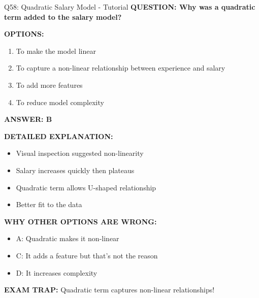\documentclass[8pt]{beamer}
\begin{document}
	\begin{frame}{Q58: Quadratic Salary Model - Tutorial}
		\fontsize{6.5}{7.5}\selectfont
		\textbf{QUESTION: Why was a quadratic term added to the salary model?}
		
		\vspace{0.1cm}
		\textbf{OPTIONS:}
		\begin{enumerate}
			\item To make the model linear
			\item To capture a non-linear relationship between experience and salary
			\item To add more features
			\item To reduce model complexity
		\end{enumerate}
		
		\vspace{0.1cm}
		\textcolor{myblue}{\textbf{ANSWER: B}}
		
		\vspace{0.1cm}
		\textbf{DETAILED EXPLANATION:}
		\begin{itemize}
			\item Visual inspection suggested non-linearity
			\item Salary increases quickly then plateaus
			\item Quadratic term allows U-shaped relationship
			\item Better fit to the data
		\end{itemize}
		
		\vspace{0.1cm}
		\textcolor{myred}{\textbf{WHY OTHER OPTIONS ARE WRONG:}}
		\begin{itemize}
			\item \textcolor{myred}{A:} Quadratic makes it non-linear
			\item \textcolor{myred}{C:} It adds a feature but that's not the reason
			\item \textcolor{myred}{D:} It increases complexity
		\end{itemize}
		
		\textcolor{myred}{\textbf{EXAM TRAP:}} Quadratic term captures \textcolor{myblue}{non-linear relationships}!
	\end{frame}
	
\end{document}
